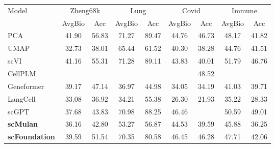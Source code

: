 \begin{table}[htbp]
  \vspace{0.3cm}

  \begin{tabular}{l|cc|cc|cc|cc}

    \toprule
    \multirow{2}{*}{Model}
      & \multicolumn{2}{c}{Zheng68k} & \multicolumn{2}{c}{Lung} & \multicolumn{2}{c}{Covid} & \multicolumn{2}{c}{Immune} \\
    \cmidrule(lr){2-3}\cmidrule(lr){4-5}\cmidrule(lr){6-7}\cmidrule(lr){8-9}
      & AvgBio & Acc & AvgBio & Acc & AvgBio & Acc & AvgBio & Acc \\
    \midrule

    PCA      & 41.90 & 56.83 & 71.27 & 89.47 & 44.76 & 46.73 & 48.17 & 41.82 \\
    UMAP      & 32.73 & 38.01 & 65.44 & 61.52 & 40.30 & 38.28 & 44.76 & 41.51 \\
    scVI      & 41.16 & 55.31 & 71.28 & 89.11 & 43.83 & 40.01 & 51.79 & 46.76 \\
    CellPLM      & \cellcolor{gray!25}{42.60} & \cellcolor{gray!25}{57.16} & \cellcolor{gray!25}{79.12} & \cellcolor{gray!25}{92.71} & \cellcolor{gray!25}{48.62} & 48.52 & \cellcolor{gray!25}{58.63} & \cellcolor{gray!25}{63.13} \\
    Geneformer      & 39.17 & 47.14 & 36.97 & 44.98 & 34.05 & 34.19 & 41.03 & 39.71 \\
    LangCell      & 33.08 & 36.92 & 34.21 & 55.38 & 26.30 & 21.93 & 35.22 & 28.33 \\
    scGPT      & 37.68 & 43.83 & 70.98 & 88.25 & 46.46 & \cellcolor{gray!25}{51.46} & 50.59 & 49.01 \\
    \cellcolor{gray!25}\textbf{scMulan}      & 36.16 & 42.80 & 53.27 & 56.87 & 44.53 & 39.59 & 45.88 & 36.25 \\
    \cellcolor{gray!25}\textbf{scFoundation}      & 39.59 & 51.54 & 70.35 & 80.58 & 46.45 & 46.28 & 47.71 & 42.06 \\
    \bottomrule
  \end{tabular}
\end{table}